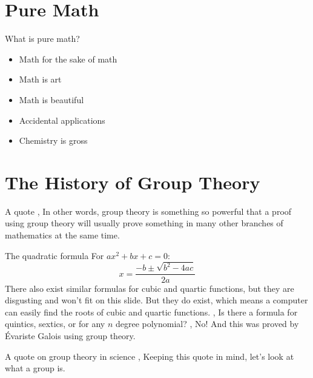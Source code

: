 \section{Pure Math}
\begin{namedframe}{What is pure math?}
	\begin{itemize}
		\item Math for the sake of math
		\item Math is art
		\item Math is beautiful
		\item Accidental applications
		\item Chemistry is gross
	\end{itemize}
\end{namedframe}
\section{The History of Group Theory}
\begin{namedframe}{A quote}
	\sep
	In other words, group theory is something so powerful that a proof using group theory will usually prove something in many other branches of mathematics at the same time.
\end{namedframe}
\begin{namedframe}{The quadratic formula}
	For $ax^2 + bx + c = 0$:
	\[x = \frac{-b \pm \sqrt{b^2 - 4ac}}{2a}\]
	There also exist similar formulas for cubic and quartic functions, but they are disgusting and won't fit on this slide. But they do exist, which means a computer can easily find the roots of cubic and quartic functions.
	\sep
	Is there a formula for quintics, sextics, or for any $n$ degree polynomial?
	\sep
	No! And this was proved by \'{E}variste Galois using group theory.
\end{namedframe}
\begin{namedframe}{A quote on group theory in science}
	\sep
	Keeping this quote in mind, let's look at what a group is.
\end{namedframe}
